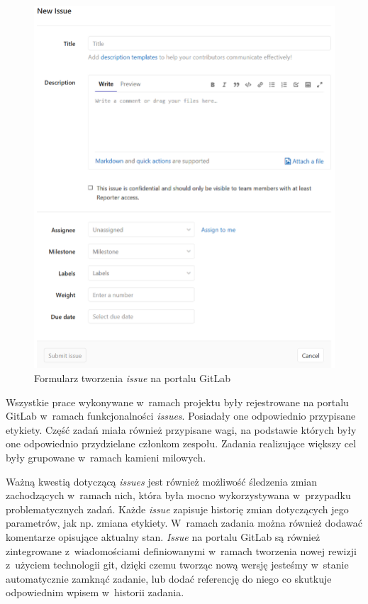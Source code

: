 \begin{figure}[H]
\centering
\includegraphics[width=\textwidth]{res/png/newIssue}
\caption{Formularz tworzenia \textit{issue} na portalu GitLab}
\label{fig:newIssue}
\end{figure}


\newpage

Wszystkie prace wykonywane w~ramach projektu były rejestrowane na portalu GitLab w~ramach funkcjonalności \textit{issues}. Posiadały one odpowiednio przypisane etykiety. Część zadań miała również przypisane wagi, na podstawie których były one odpowiednio przydzielane członkom zespołu. Zadania realizujące większy cel były grupowane w~ramach kamieni milowych.

Ważną kwestią dotyczącą \textit{issues} jest również możliwość śledzenia zmian zachodzących w~ramach nich, która była mocno wykorzystywana w~przypadku problematycznych zadań. Każde \textit{issue} zapisuje historię zmian dotyczących jego parametrów, jak np. zmiana etykiety. W~ramach zadania można również dodawać komentarze opisujące aktualny stan. \textit{Issue} na portalu GitLab są również zintegrowane z~wiadomościami definiowanymi w~ramach tworzenia nowej rewizji z~użyciem technologii \gls*{git}, dzięki czemu tworząc nową wersję jesteśmy w~stanie automatycznie zamknąć zadanie, lub dodać referencję do niego co skutkuje odpowiednim wpisem w~historii zadania.

